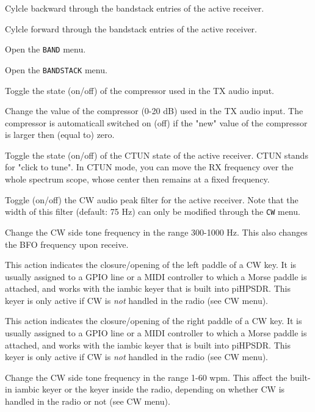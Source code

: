 \documentclass[12pt]{book}
\def\bltt#1{\texttt{\color{blue}#1}}
\begin{document}
{Cylcle backward through the bandstack entries of the active receiver.}

{Cylcle forward through the bandstack entries of the active receiver.}

{Open the \texttt{BAND} menu.}

{Open the \texttt{BANDSTACK} menu.}

{Toggle the state (on/off) of the compressor used in the TX audio input.}

{Change the value of the compressor (0-20 dB) used in the TX audio input. The compressor is automaticall
switched on (off) if the "new" value of the compressor is larger then  (equal to) zero.}

{Toggle the state (on/off) of the CTUN state of the active receiver. CTUN stands for "click to tune". In
CTUN mode, you can move
the RX frequency over the whole spectrum scope, whose center then remains at a fixed frequency.}

{Toggle (on/off) the CW audio peak filter for the active receiver. Note that the width of this
filter (default: 75 Hz) can only be modified through the \bltt{CW} menu.}

{Change the CW side tone frequency in the range 300-1000 Hz. This also changes the BFO frequency upon
receive.}

{This action indicates the closure/opening of the left paddle of a CW key. It is usually assigned to a GPIO
line or a MIDI
controller to which a Morse paddle is attached, and works with the iambic keyer that is built into piHPSDR.
This keyer
is only active if CW is \textit{not} handled in the radio (see CW menu).}

{This action indicates the closure/opening of the right paddle of a CW key. It is usually assigned to a GPIO
line or a MIDI
controller to which a Morse paddle is attached, and works with the iambic keyer that is built into piHPSDR.
This keyer
is only active if CW is \textit{not} handled in the radio (see CW menu).}

{Change the CW side tone frequency in the range 1-60 wpm. This affect the built-in iambic keyer or the keyer
inside the radio,
depending on whether CW is handled in the radio or not (see CW menu).}
\end{document}
